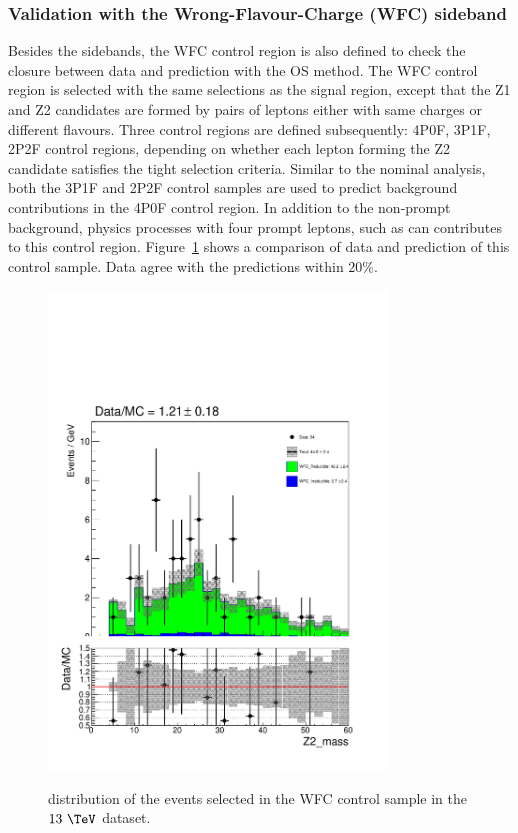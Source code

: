 \subsubsection{Validation with the Wrong-Flavour-Charge (WFC) sideband}
Besides the \mass{4\ell} sidebands, the WFC control region is also defined to check the closure 
between data and prediction with the OS method. The WFC control region is selected with the same selections as the signal 
region, except that the Z1 and Z2 candidates are formed by pairs of leptons either with same charges or different flavours.
Three control regions are defined subsequently: 4P0F, 3P1F, 2P2F control regions, depending on whether each lepton forming 
the Z2 candidate satisfies the tight selection criteria.
Similar to the nominal analysis, both the 3P1F and 2P2F control samples are used to predict \zx background contributions in 
the 4P0F control region. In addition to the non-prompt \zx background, physics processes with four prompt leptons, such as 
\qqZZ can contributes to this control region.
Figure~\ref{fig:WFC} shows a comparison of data and prediction of this control sample. Data agree with the predictions
within $20\%$.

\begin{figure}[!htb]
\begin{center}
    {\includegraphics [width=0.8\textwidth] {Figures/RedBkg/WFC/Z2_mass}}
\caption{
     distribution of the events selected in the WFC control sample in the$13~\TeV$ dataset.
}
\label{fig:WFC}
\end{center}
\end{figure}

